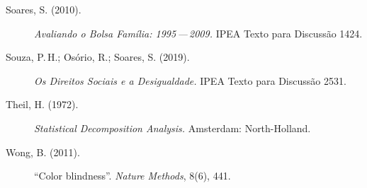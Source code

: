 \documentclass[12pt,a4paper,oneside]{article}
\begin{document}
\begin{description}
\item[Soares, S. (2010).]
\textit{Avaliando o Bolsa Família: 1995\,---\,2009.}
IPEA Texto para Discussão 1424.

\item[Souza, P.\,H.; Osório, R.; Soares, S. (2019).]
\textit{Os Direitos Sociais e a Desigualdade.}
IPEA Texto para Discussão 2531.

\item[Theil, H. (1972).]
\textit{Statistical Decomposition Analysis.}
Amsterdam: North-Holland.

\item[Wong, B. (2011).]
``Color blindness''.
\textit{Nature Methods}, 8(6), 441.

\end{description}
\end{document}
